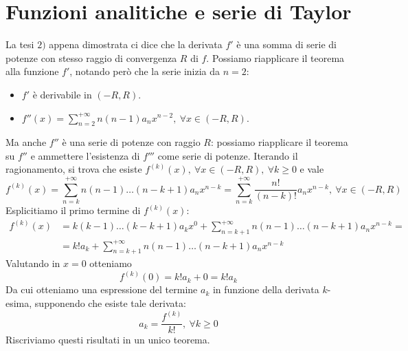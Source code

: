 \section{Funzioni analitiche e serie di Taylor}
La tesi $2)$ appena dimostrata ci dice che la derivata $f'$ è una somma di serie di potenze con stesso raggio di convergenza $R$ di $f$. Possiamo riapplicare il teorema alla funzione $f'$, notando però che la serie inizia da $n=2$:
\begin{itemize}
	\item $f'$ è derivabile in $\left(-R,R\right)$.
	\item $\displaystyle f''(x)=\sum_{n=2}^{+\infty}n\left(n-1\right)a_nx^{n-2},\ \forall x\in\left(-R,R\right)$.
\end{itemize}
Ma anche $f''$ è una serie di potenze con raggio $R$: possiamo riapplicare il teorema su $f''$ e ammettere l'esistenza di $f'''$ come serie di potenze. Iterando il ragionamento, si trova che esiste $f^{\left(k\right)}(x),\ \forall x\in\left(-R,R\right),\ \forall k\geq 0$ e vale
\begin{equation}
	f^{\left(k\right)}(x)=\sum_{n=k}^{+\infty}n\left(n-1\right)\ldots\left(n-k+1\right)a_nx^{n-k}=\sum_{n=k}^{+\infty}\frac{n!}{\left(n-k\right)!}a_nx^{n-k},\ \forall x\in\left(-R,R\right)
\end{equation}
Esplicitiamo il primo termine di $f^{\left(k\right)}(x)$:
\begin{align*}
	f^{\left(k\right)}(x)&=k\left(k-1\right)\ldots\left(k-k+1\right)a_kx^0+\sum_{n=k+1}^{+\infty}n\left(n-1\right)\ldots\left(n-k+1\right)a_nx^{n-k}=\\
	&=k!a_k+\sum_{n=k+1}^{+\infty}n\left(n-1\right)\ldots\left(n-k+1\right)a_nx^{n-k}
\end{align*}
Valutando in $x=0$ otteniamo
\begin{equation*}
	f^{\left(k\right)}\left(0\right)=k!a_k+0=k!a_k
\end{equation*}
Da cui otteniamo una espressione del termine $a_k$ in funzione della derivata $k$-esima, supponendo che esiste tale derivata:
\begin{equation}
	a_k=\frac{f^{\left(k\right)}}{k!},\ \forall k\geq 0
\end{equation}
Riscriviamo questi risultati in un unico teorema.
